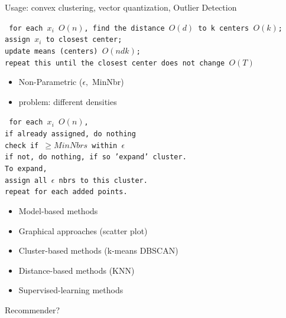 \documentclass[1pt,letter]{article}
\def\items#1{\begin{itemize}[noitemsep,topsep=0pt,parsep=0pt,partopsep=0pt]#1\end{itemize}}
\begin{document}
\begin{minipage}{0.45\textwidth}
{{                \item Usage: convex clustering, vector quantization, Outlier Detection
            }
            \texttt{
                for each $x_i$ $O(n)$, find the distance $O(d)$ to k centers $O(k)$; \\
                assign  $x_i$ to closest center; \\
                update means (centers) $O(ndk)$; \\
                repeat this until the closest center does not change $O(T)$             
            }
        \item
            \items{
                \item Non-Parametric ($\epsilon,$ MinNbr)
                \item problem: different densities 
            }
            \texttt{
                for each $x_i$ $O(n)$, \\
                if already assigned, do nothing \\
                check if $\geq MinNbrs$ within $\epsilon$ \\
                if not, do nothing, if so 'expand' cluster. \\
                To expand, \\
                assign all $\epsilon$ nbrs to this cluster. \\
                repeat for each added points.
            }
        \item
            \items{
                \item Model-based methods
                \item Graphical approaches (scatter plot)
                \item Cluster-based methods (k-means DBSCAN)
                \item Distance-based methods (KNN)
                \item Supervised-learning methods    
            }
        \item
            Recommender?
    }

\end{minipage}
\end{document}
